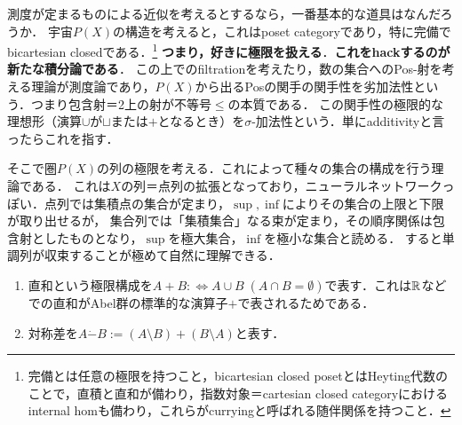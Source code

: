 \documentclass[uplatex, dvipdfmx]{jsreport}
\begin{document}
\begin{tcolorbox}[colframe=ForestGreen, colback=ForestGreen!10!white,breakable,colbacktitle=ForestGreen!40!white,coltitle=black,fonttitle=\bfseries\sffamily,
    title=積分論とは，集合の列による極限構成を基本言語とする理論である]
    測度が定まるものによる近似を考えるとするなら，一番基本的な道具はなんだろうか．
    宇宙$P(X)$の構造を考えると，これはposet categoryであり，特に完備でbicartesian closedである．\footnote{完備とは任意の極限を持つこと，bicartesian closed posetとはHeyting代数のことで，直積と直和が備わり，指数対象＝cartesian closed categoryにおけるinternal homも備わり，これらがcurryingと呼ばれる随伴関係を持つこと．}
    \textbf{つまり，好きに極限を扱える}．\textbf{これをhackするのが新たな積分論である}．
    この上でのfiltrationを考えたり，数の集合へのPos-射を考える理論が測度論であり，$P(X)$から出るPosの関手の関手性を劣加法性という．つまり包含射＝2上の射が不等号$\le$の本質である．
    この関手性の極限的な理想形（演算$\cup$が$\sqcup$または$+$となるとき）を$\sigma$-加法性という．単にadditivityと言ったらこれを指す．

    そこで圏$P(X)$の列の極限を考える．これによって種々の集合の構成を行う理論である．
    これは$X$の列＝点列の拡張となっており，ニューラルネットワークっぽい．点列では集積点の集合が定まり，$\sup,\inf$によりその集合の上限と下限が取り出せるが，
    集合列では「集積集合」なる束が定まり，その順序関係は包含射としたものとなり，$\sup$を極大集合，$\inf$を極小な集合と読める．
    すると単調列が収束することが極めて自然に理解できる．
\end{tcolorbox}

\begin{notation}\mbox{}
    \begin{enumerate}
        \item 直和という極限構成を$A+B:\Leftrightarrow A\cup B\;(A\cap B=\emptyset)$で表す．これは$\mathbb{R}$などでの直和がAbel群の標準的な演算子$+$で表されるためである．
        \item 対称差を$A\dot{-}B:=(A\setminus B)+(B\setminus A)$と表す．
    \end{enumerate}
\end{notation}
\end{document}
